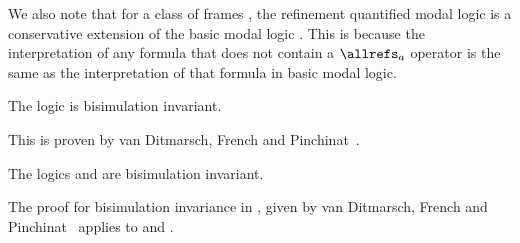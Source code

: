 We also note that for a class of frames \classC{}, the refinement quantified
modal logic \logicCF{} is a conservative extension of the basic modal logic
\logicC{}. This is because the interpretation of any formula that does not
contain a $\allrefs_a$ operator is the same as the interpretation of that
formula in basic modal logic.

\begin{lemma}
The logic \logicKF{} is bisimulation invariant.
\end{lemma}

This is proven by van Ditmarsch, French and Pinchinat~\cite{french2010future}.

\begin{lemma}
The logics \logicKDF{} and \logicSF{} are bisimulation invariant.
\end{lemma}

The proof for bisimulation invariance in \logicKF{}, given by van Ditmarsch,
French and Pinchinat~\cite{french2010future} applies to \logicSF{} and
\logicKDF{}.
